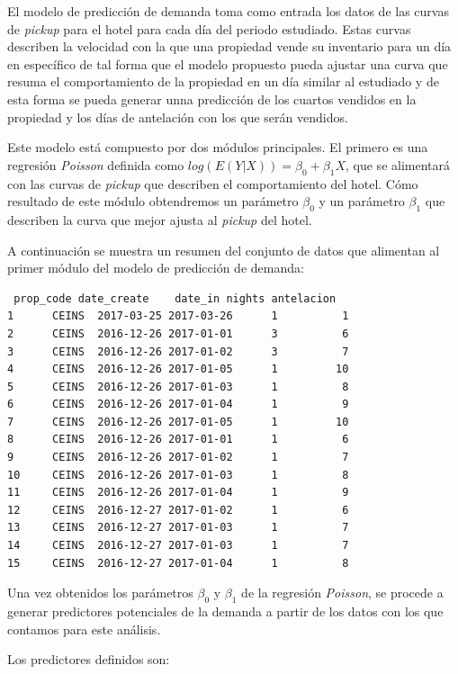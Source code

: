 El modelo de predicción de demanda toma como entrada los datos de las curvas de \emph{pickup} para el hotel para cada día del periodo estudiado. Estas curvas describen la velocidad con la que una propiedad vende su inventario para un día en específico de tal forma que el modelo propuesto pueda ajustar una curva que resuma el comportamiento de la propiedad en un día similar al estudiado y de esta forma se pueda generar unna predicción de los cuartos vendidos en la propiedad y los días de antelación con los que serán vendidos.

Este modelo está compuesto por dos módulos principales. El primero es una regresión \emph{Poisson} definida como $log(E(Y|X)) = \beta_0 + \beta_1X$, que se alimentará con las curvas de \emph{pickup} que describen el comportamiento del hotel. Cómo resultado de este módulo obtendremos un parámetro $\beta_0$ y un parámetro $\beta_1$ que describen la curva que mejor ajusta al \emph{pickup} del hotel.

A continuación se muestra un resumen del conjunto de datos que alimentan al primer módulo del modelo de predicción de demanda:

\begin{verbatim}
 prop_code date_create    date_in nights antelacion
1      CEINS  2017-03-25 2017-03-26      1          1
2      CEINS  2016-12-26 2017-01-01      3          6
3      CEINS  2016-12-26 2017-01-02      3          7
4      CEINS  2016-12-26 2017-01-05      1         10
5      CEINS  2016-12-26 2017-01-03      1          8
6      CEINS  2016-12-26 2017-01-04      1          9
7      CEINS  2016-12-26 2017-01-05      1         10
8      CEINS  2016-12-26 2017-01-01      1          6
9      CEINS  2016-12-26 2017-01-02      1          7
10     CEINS  2016-12-26 2017-01-03      1          8
11     CEINS  2016-12-26 2017-01-04      1          9
12     CEINS  2016-12-27 2017-01-02      1          6
13     CEINS  2016-12-27 2017-01-03      1          7
14     CEINS  2016-12-27 2017-01-03      1          7
15     CEINS  2016-12-27 2017-01-04      1          8
\end{verbatim}

Una vez obtenidos los parámetros $\beta_0$ y $\beta_1$ de la regresión \emph{Poisson}, se procede a generar predictores potenciales de la demanda a partir de los datos con los que contamos para este análisis.

Los predictores definidos son:

